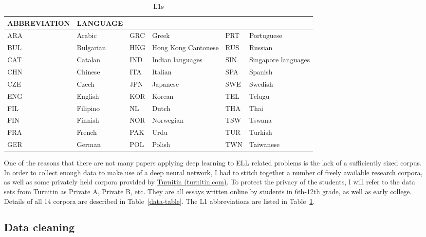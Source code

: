 \documentclass{article} %
\begin{document}
\begin{table}
\caption{L1s}
\label{L1s-table}
\begin{center}
\begin{tabularx}{\textwidth}{l l l l l l }
\multicolumn{1}{c}{\bf ABBREVIATION} & \multicolumn{1}{c}{\bf LANGUAGE} \\
\hline
ARA & Arabic &    GRC  & Greek   &          PRT  & Portuguese \\
BUL & Bulgarian &      HKG  &  Hong Kong Cantonese       &    RUS  & Russian \\
CAT & Catalan &    IND  & Indian languages   &           SIN  & Singapore languages \\
CHN & Chinese &    ITA  & Italian        &   SPA  & Spanish \\
CZE & Czech &     JPN  & Japanese         &     SWE  & Swedish \\
ENG & English &    KOR  & Korean         &   TEL  & Telugu \\
FIL & Filipino &       NL  &  Dutch      &       THA &  Thai \\
FIN & Finnish &    NOR &  Norwegian       &      TSW  & Tswana \\
FRA & French &     PAK  & Urdu         &     TUR  & Turkish \\
GER & German &     POL  & Polish    &        TWN  & Taiwanese
\end{tabularx}
\end{center}
\end{table}

One of the reasons that there are not many papers applying deep learning to ELL
related problems is the lack of a sufficiently sized corpus. In order to collect
enough data to make use of a deep neural network, I had to stitch together a
number of freely available research corpora, as well as some privately held
corpora provided by \href{http://turnitin.com/}{Turnitin (turnitin.com)}. To
protect the privacy of the students, I will refer to the data sets from Turnitin
as Private A, Private B, etc. They are all essays written online by students in
6th-12th grade, as well as early college. Details of all 14 corpora are described
in Table~\ref{data-table}. The L1 abbreviations are listed in Table~\ref{L1s-table}.

\subsection{Data cleaning}
\end{document}
